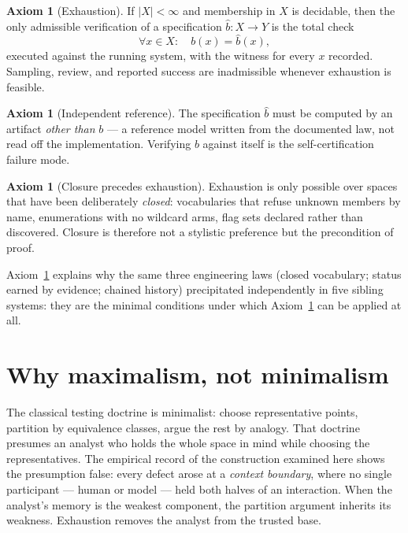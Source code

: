 \documentclass[11pt,a4paper]{report}
\theoremstyle{definition}
\newtheorem{axiom}[theorem]{Axiom}
\theoremstyle{remark}
\begin{document}
\begin{axiom}[Exhaustion]\label{ax:exhaustion}
If $|X| < \infty$ and membership in $X$ is decidable, then the only admissible
verification of a specification $\hat b : X \to Y$ is the total check
\[
  \forall x \in X:\quad b(x) = \hat b(x),
\]
executed against the running system, with the witness for every $x$ recorded.
Sampling, review, and reported success are inadmissible whenever exhaustion is
feasible.
\end{axiom}

\begin{axiom}[Independent reference]\label{ax:reference}
The specification $\hat b$ must be computed by an artifact \emph{other than}
$b$ --- a reference model written from the documented law, not read off the
implementation. Verifying $b$ against itself is the self-certification
failure mode.
\end{axiom}

\begin{axiom}[Closure precedes exhaustion]\label{ax:closure}
Exhaustion is only possible over spaces that have been deliberately
\emph{closed}: vocabularies that refuse unknown members by name, enumerations
with no wildcard arms, flag sets declared rather than discovered. Closure is
therefore not a stylistic preference but the precondition of proof.
\end{axiom}

Axiom~\ref{ax:closure} explains why the same three engineering laws
(closed vocabulary; status earned by evidence; chained history) precipitated
independently in five sibling systems: they are the minimal conditions under
which Axiom~\ref{ax:exhaustion} can be applied at all.

\section{Why maximalism, not minimalism}

The classical testing doctrine is minimalist: choose representative points,
partition by equivalence classes, argue the rest by analogy. That doctrine
presumes an analyst who holds the whole space in mind while choosing the
representatives. The empirical record of the construction examined here shows
the presumption false: every defect arose at a \emph{context boundary}, where
no single participant --- human or model --- held both halves of an
interaction. When the analyst's memory is the weakest component, the
partition argument inherits its weakness. Exhaustion removes the analyst from
the trusted base.
\end{document}
